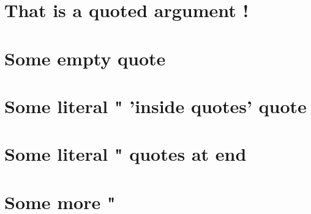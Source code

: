 \chapter{That is a quoted argument !}
\label{s:1}
\chapter{Some empty quote}
\label{s:2}
\chapter{Some literal " 'inside quotes' quote}
\label{s:3}
\chapter{Some literal " quotes at end}
\label{s:4}
\chapter{Some more "}
\label{s:5}

